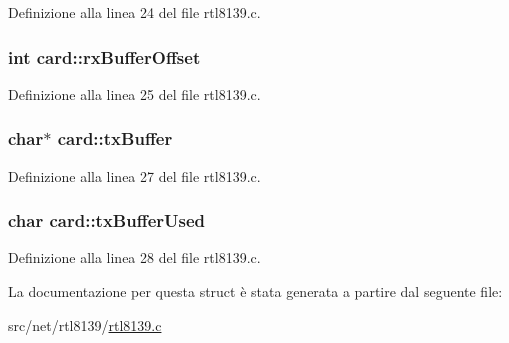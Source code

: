 Definizione alla linea 24 del file rtl8139.\+c.

\hypertarget{structcard_a9492d8053fa4c304877e1f9959b48731}{
\subsubsection[{rx\+Buffer\+Offset}]{\setlength{\rightskip}{0pt plus 5cm}int card\+::rx\+Buffer\+Offset}}\label{structcard_a9492d8053fa4c304877e1f9959b48731}


Definizione alla linea 25 del file rtl8139.\+c.

\hypertarget{structcard_a733cf5ffa3a9d2bf6cf28473817915b6}{
\subsubsection[{tx\+Buffer}]{\setlength{\rightskip}{0pt plus 5cm}char$\ast$ card\+::tx\+Buffer}}\label{structcard_a733cf5ffa3a9d2bf6cf28473817915b6}


Definizione alla linea 27 del file rtl8139.\+c.

\hypertarget{structcard_a2294d3601ad6be7638b30f68496d589e}{
\subsubsection[{tx\+Buffer\+Used}]{\setlength{\rightskip}{0pt plus 5cm}char card\+::tx\+Buffer\+Used}}\label{structcard_a2294d3601ad6be7638b30f68496d589e}


Definizione alla linea 28 del file rtl8139.\+c.



La documentazione per questa struct è stata generata a partire dal seguente file\+:\begin{DoxyCompactItemize}
\item 
src/net/rtl8139/\hyperlink{rtl8139_8c}{rtl8139.\+c}\end{DoxyCompactItemize}
